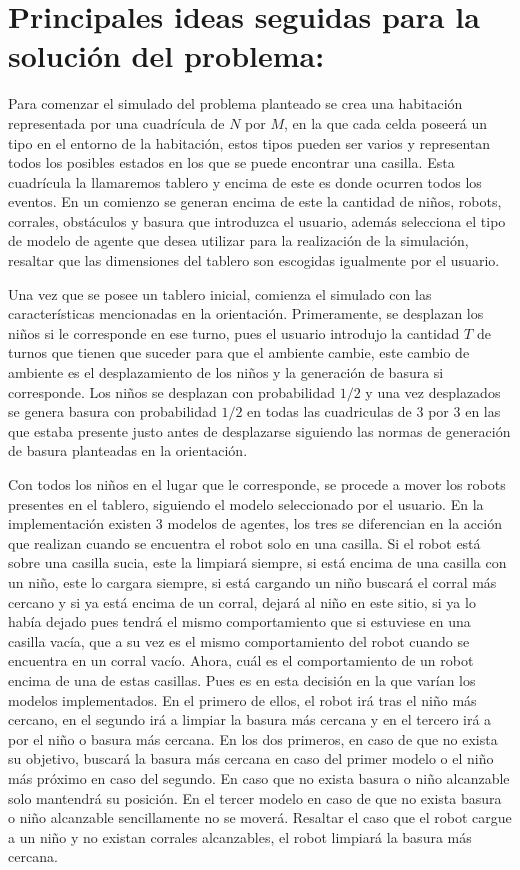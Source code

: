 \documentclass[titlepage,11pt]{scrartcl}
\begin{document}
\section{Principales ideas seguidas para la solución del problema:}
Para comenzar el simulado del problema planteado se crea una habitación representada por una cuadrícula de $N$ por $M$, en la que cada celda poseerá un tipo en el entorno de la habitación, estos tipos pueden ser varios y representan todos los posibles estados en los que se puede encontrar una casilla. Esta cuadrícula la llamaremos tablero y encima de este es donde ocurren todos los eventos. En un comienzo se generan encima de este la cantidad de niños, robots, corrales, obstáculos y basura que introduzca el usuario, además selecciona el tipo de modelo de agente que desea utilizar para la realización de la simulación, resaltar que las dimensiones del tablero son escogidas igualmente por el usuario.

Una vez que se posee un tablero inicial, comienza el simulado con las características mencionadas en la orientación. Primeramente, se desplazan los niños si le corresponde en ese turno, pues el usuario introdujo la cantidad $T$ de turnos que tienen que suceder para que el ambiente cambie, este cambio de ambiente es el desplazamiento de los niños y la generación de basura si corresponde. Los niños se desplazan con probabilidad $1/2$ y una vez desplazados se genera basura con probabilidad $1/2$ en todas las cuadriculas de $3$ por $3$ en las que estaba presente justo antes de desplazarse siguiendo las normas de generación de basura planteadas en la orientación.

Con todos los niños en el lugar que le corresponde, se procede a mover los robots presentes en el tablero, siguiendo el modelo seleccionado por el usuario. En la implementación existen 3 modelos de agentes, los tres se diferencian en la acción que realizan cuando se encuentra el robot solo en una casilla. Si el robot está sobre una casilla sucia, este la limpiará siempre, si está encima de una casilla con un niño, este lo cargara siempre, si está cargando un niño buscará el corral más cercano y si ya está encima de un corral, dejará al niño en este sitio, si ya lo había dejado pues tendrá el mismo comportamiento que si estuviese en una casilla vacía, que a su vez es el mismo comportamiento del robot cuando se encuentra en un corral vacío. Ahora, cuál es el comportamiento de un robot encima de una de estas casillas. Pues es en esta decisión en la que varían los modelos implementados. En el primero de ellos, el robot irá tras el niño más cercano, en el segundo irá a limpiar la basura más cercana y en el tercero irá a por el niño o basura más cercana. En los dos primeros, en caso de que no exista su objetivo, buscará la basura más cercana en caso del primer modelo o el niño más próximo en caso del segundo. En caso que no exista basura o niño alcanzable solo mantendrá su posición. En el tercer modelo en caso de que no exista basura o niño alcanzable sencillamente no se moverá. Resaltar el caso que el robot cargue a un niño y no existan corrales alcanzables, el robot limpiará la basura más cercana.
\end{document}
